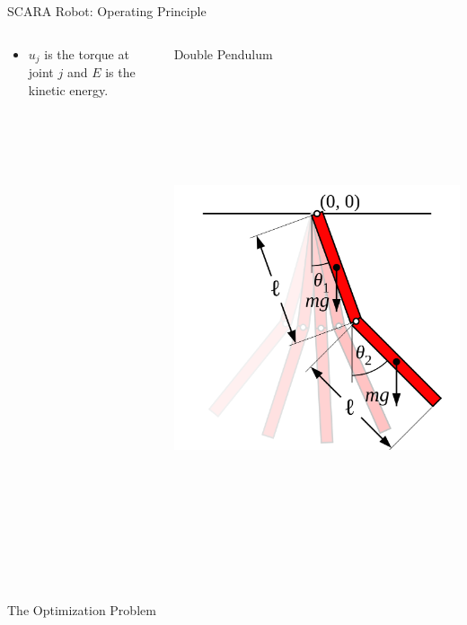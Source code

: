 \documentclass[final]{beamer}
\begin{document}
\begin{frame}{}
{\begin{columns}[t]
\begin{column}{.30\linewidth}
\begin{block}{\centering SCARA Robot: Operating Principle}
\begin{columns}[T]
\begin{column}{16cm}{}
\begin{itemize}
	\item $u_j$ is the torque at joint $j$ and $E$ is the kinetic energy.
\end{itemize}
\end{column}
\begin{column}{16cm}{}
Double Pendulum
\centering\includegraphics[height=15cm, width = 15cm]{figures/double-pendulum.png}\\
\end{column}

\end{columns}

\end{block}

                
                

\begin{block}{\centering The Optimization Problem}


\begin{columns}[T]


\end{columns}
\end{block}
\end{column}
\end{columns}}
\end{frame}
\end{document}
